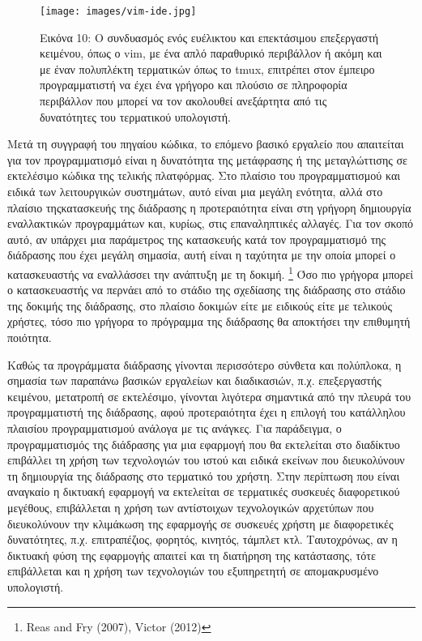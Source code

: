 \documentclass[
]{article}
\begin{document}
\leavevmode{}%
\begin{figure}
\hypertarget{fig:vim-ide}{%
\centering
\texttt{[image: images/vim-ide.jpg]}
\caption{Εικόνα 10: Ο συνδυασμός ενός ευέλικτου και επεκτάσιμου
επεξεργαστή κειμένου, όπως ο vim, με ένα απλό παραθυρικό περιβάλλον ή
ακόμη και με έναν πολυπλέκτη τερματικών όπως το tmux, επιτρέπει στον
έμπειρο προγραμματιστή να έχει ένα γρήγορο και πλούσιο σε πληροφορία
περιβάλλον που μπορεί να τον ακολουθεί ανεξάρτητα από τις δυνατότητες
του τερματικού υπολογιστή.}\label{fig:vim-ide}
}
\end{figure}

Μετά τη συγγραφή του πηγαίου κώδικα, το επόμενο βασικό εργαλείο που
απαιτείται για τον προγραμματισμό είναι η δυνατότητα της μετάφρασης ή
της μεταγλώττισης σε εκτελέσιμο κώδικα της τελικής πλατφόρμας. Στο
πλαίσιο του προγραμματισμού και ειδικά των λειτουργικών συστημάτων, αυτό
είναι μια μεγάλη ενότητα, αλλά στο πλαίσιο τηςκατασκευής της διάδρασης η
προτεραιότητα είναι στη γρήγορη δημιουργία εναλλακτικών προγραμμάτων
και, κυρίως, στις επαναληπτικές αλλαγές. Για τον σκοπό αυτό, αν υπάρχει
μια παράμετρος της κατασκευής κατά τον προγραμματισμό της διάδρασης που
έχει μεγάλη σημασία, αυτή είναι η ταχύτητα με την οποία μπορεί ο
κατασκευαστής να εναλλάσσει την ανάπτυξη με τη δοκιμή. \footnote{Reas
  and Fry (2007), Victor (2012)} Όσο πιο γρήγορα μπορεί ο κατασκευαστής
να περνάει από το στάδιο της σχεδίασης της διάδρασης στο στάδιο της
δοκιμής της διάδρασης, στο πλαίσιο δοκιμών είτε με ειδικούς είτε με
τελικούς χρήστες, τόσο πιο γρήγορα το πρόγραμμα της διάδρασης θα
αποκτήσει την επιθυμητή ποιότητα.

Καθώς τα προγράμματα διάδρασης γίνονται περισσότερο σύνθετα και
πολύπλοκα, η σημασία των παραπάνω βασικών εργαλείων και διαδικασιών,
π.χ. επεξεργαστής κειμένου, μετατροπή σε εκτελέσιμο, γίνονται λιγότερα
σημαντικά από την πλευρά του προγραμματιστή της διάδρασης, αφού
προτεραιότητα έχει η επιλογή του κατάλληλου πλαισίου προγραμματισμού
ανάλογα με τις ανάγκες. Για παράδειγμα, ο προγραμματισμός της διάδρασης
για μια εφαρμογή που θα εκτελείται στο διαδίκτυο επιβάλλει τη χρήση των
τεχνολογιών του ιστού και ειδικά εκείνων που διευκολύνουν τη δημιουργία
της διάδρασης στο τερματικό του χρήστη. Στην περίπτωση που είναι
αναγκαίο η δικτυακή εφαρμογή να εκτελείται σε τερματικές συσκευές
διαφορετικού μεγέθους, επιβάλλεται η χρήση των αντίστοιχων τεχνολογικών
αρχετύπων που διευκολύνουν την κλιμάκωση της εφαρμογής σε συσκευές
χρήστη με διαφορετικές δυνατότητες, π.χ. επιτραπέζιος, φορητός, κινητός,
τάμπλετ κτλ. Ταυτοχρόνως, αν η δικτυακή φύση της εφαρμογής απαιτεί και
τη διατήρηση της κατάστασης, τότε επιβάλλεται και η χρήση των
τεχνολογιών του εξυπηρετητή σε απομακρυσμένο υπολογιστή.
\end{document}
